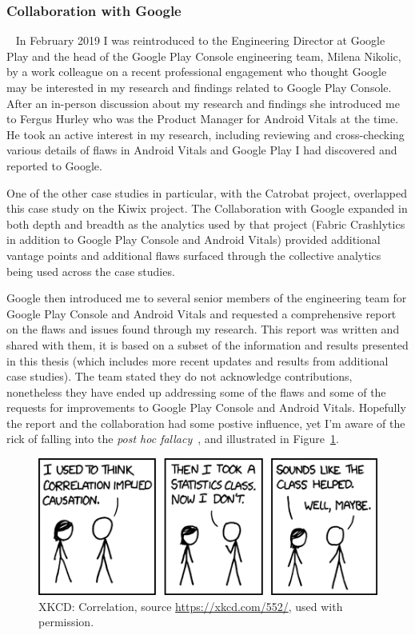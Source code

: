 \subsubsection{Collaboration with Google}~\label{section-collaboration-with-google}
In February 2019 I was reintroduced to the Engineering Director at Google Play and the head of the Google Play Console engineering team, Milena Nikolic, by a work colleague on a recent professional engagement who thought Google may be interested in my research and findings related to Google Play Console. After an in-person discussion about my research and findings she introduced me to Fergus Hurley who was the Product Manager for Android Vitals at the time. He took an active interest in my research, including reviewing and cross-checking various details of flaws in Android Vitals and Google Play I had discovered and reported to Google. 

One of the other case studies in particular, with the Catrobat project, overlapped this case study on the Kiwix project. The Collaboration with Google expanded in both depth and breadth as the analytics used by that project (Fabric Crashlytics in addition to Google Play Console and Android Vitals) provided additional vantage points and additional flaws surfaced through the collective analytics being used across the case studies. 

Google then introduced me to several senior members of the engineering team for Google Play Console and Android Vitals and requested a comprehensive report on the flaws and issues found through my research. This report was written and shared with them, it is based on a subset of the information and results presented in this thesis (which includes more recent updates and results from additional case studies). The team stated they do not acknowledge contributions, nonetheless they have ended up addressing some of the flaws and some of the requests for improvements to Google Play Console and Android Vitals. Hopefully the report and the collaboration had some postive influence, yet I'm aware of the rick of falling into the \textit{post hoc fallacy}~\citep{wikipedia_post_hoc_fallacy}, and illustrated in Figure~\ref{fig:xkcd-correlation}.

\begin{figure}
    \centering
    \includegraphics{images/xkcd/correlation-552.png}
    \caption{XKCD: Correlation, source \url{https://xkcd.com/552/}, used with permission.}
    \label{fig:xkcd-correlation}
\end{figure}

